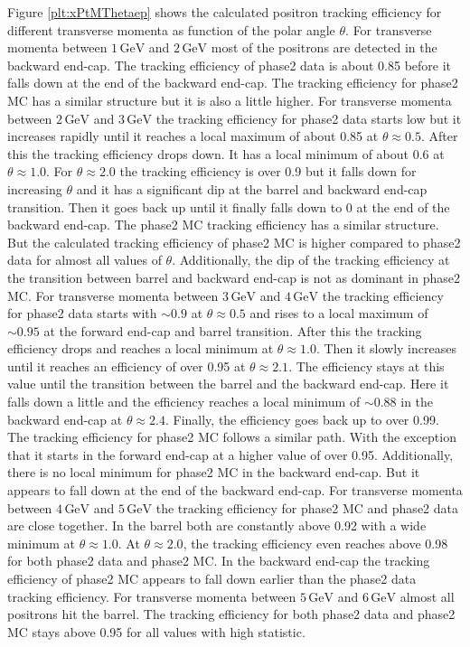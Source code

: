 \documentclass[a4paper,11pt,twosided,final,german,openbib,pdftex,listof=totoc,bibliography=totoc]{scrbook}
\begin{document}
Figure \ref{plt:xPtMThetaep} shows the calculated positron tracking efficiency for different transverse momenta as function of the polar angle $\theta$. For transverse momenta between $1\,\textrm{GeV}$ and $2\,\textrm{GeV}$ most of the positrons are detected in the backward end-cap. The tracking efficiency of phase2 data is about 0.85 before it falls down at the end of the backward end-cap. The tracking efficiency for phase2 MC has a similar structure but it is also a little higher.
For transverse momenta between $2\,\textrm{GeV}$ and $3\,\textrm{GeV}$ the tracking efficiency for phase2 data starts low  but it increases rapidly until it reaches a local maximum of about 0.85 at $\theta \approx 0.5$. After this the tracking efficiency drops down. It has a local minimum of about 0.6 at $\theta \approx 1.0$. For $\theta \approx 2.0$ the tracking efficiency is over 0.9 but it falls down for increasing $\theta$ and it has a significant dip at the barrel and backward end-cap transition. Then it goes back up until it finally falls down to 0 at the end of the backward end-cap. The phase2 MC tracking efficiency has a similar structure. But the calculated tracking efficiency of phase2 MC is higher compared to phase2 data for almost all values of $\theta$. Additionally, the dip of the tracking efficiency at the transition between barrel and backward end-cap is not as dominant in phase2 MC.
For transverse momenta between $3\,\textrm{GeV}$ and $4\,\textrm{GeV}$ the tracking efficiency for phase2 data starts with $\sim 0.9$ at $\theta \approx 0.5$ and rises to a local maximum of $\sim 0.95$ at the forward end-cap and barrel transition. After this the tracking efficiency drops and reaches a local minimum at $\theta \approx 1.0$. Then it slowly increases until it reaches an efficiency of over 0.95 at $\theta \approx 2.1$. The efficiency stays at this value until the transition between the barrel and the backward end-cap. Here it falls down a little and the efficiency reaches a local minimum of $\sim 0.88$ in the backward end-cap at $\theta \approx 2.4$. Finally, the efficiency goes back up to over 0.99. The tracking efficiency for phase2 MC follows a similar path. With the exception that it starts in the forward end-cap at a higher value of over 0.95. Additionally, there is no local minimum for phase2 MC in the backward end-cap. But it appears to fall down at the end of the backward end-cap.
For transverse momenta between $4\,\textrm{GeV}$  and $5\,\textrm{GeV}$ the tracking efficiency for phase2 MC and phase2 data are close together. In the barrel both are constantly above 0.92 with a wide minimum at $\theta \approx 1.0$. At $\theta \approx 2.0$, the tracking efficiency even reaches above 0.98 for both phase2 data and phase2 MC. In the backward end-cap the tracking efficiency of phase2 MC appears to fall down earlier than the phase2 data tracking efficiency.
For transverse momenta between $5\,\textrm{GeV}$ and $6\,\textrm{GeV}$ almost all positrons hit the barrel. The tracking efficiency for both phase2 data and phase2 MC stays above 0.95 for all values with high statistic.
\end{document}
